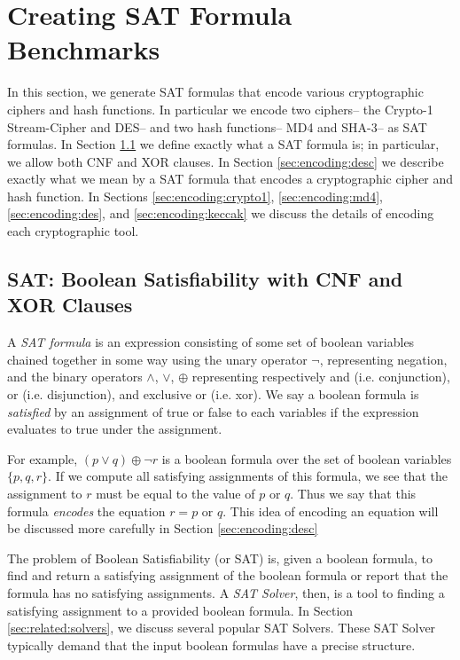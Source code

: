 \section{Creating SAT Formula Benchmarks}
\label{sec:encoding}

In this section, we generate SAT formulas that encode various cryptographic ciphers and hash functions. In particular we encode two ciphers-- the Crypto-1 Stream-Cipher and DES-- and two hash functions-- MD4 and SHA-3-- as SAT formulas. In Section \ref{sec:encoding:sat} we define exactly what a SAT formula is; in particular, we allow both CNF and XOR clauses. In Section \ref{sec:encoding:desc} we describe exactly what we mean by a SAT formula that encodes a cryptographic cipher and hash function. In Sections \ref{sec:encoding:crypto1}, \ref{sec:encoding:md4}, \ref{sec:encoding:des}, and \ref{sec:encoding:keccak} we discuss the details of encoding each cryptographic tool.

\subsection{SAT: Boolean Satisfiability with CNF and XOR Clauses}
\label{sec:encoding:sat}

A \emph{SAT formula} is an expression consisting of some set of boolean variables chained together in some way using the unary operator $\neg$, representing negation, and the binary operators $\land$, $\lor$, $\oplus$ representing respectively and (i.e. conjunction), or (i.e. disjunction), and exclusive or (i.e. xor). We say a boolean formula is \emph{satisfied} by an assignment of true or false to each variables if the expression evaluates to true under the assignment.

For example, $(p \lor q) \oplus \neg r$ is a boolean formula over the set of boolean variables $\{p, q, r\}$. If we compute all satisfying assignments of this formula, we see that the assignment to $r$ must be equal to the value of $p \text{ or } q$. Thus we say that this formula \emph{encodes} the equation $r = p \text{ or } q$. This idea of encoding an equation will be discussed more carefully in Section \ref{sec:encoding:desc}

The problem of Boolean Satisfiability (or SAT) is, given a boolean formula, to find and return a satisfying assignment of the boolean formula or report that the formula has no satisfying assignments. A \emph{SAT Solver}, then, is a tool to finding a satisfying assignment to a provided boolean formula. In Section \ref{sec:related:solvers}, we discuss several popular SAT Solvers. These SAT Solver typically demand that the input boolean formulas have a precise structure. 

